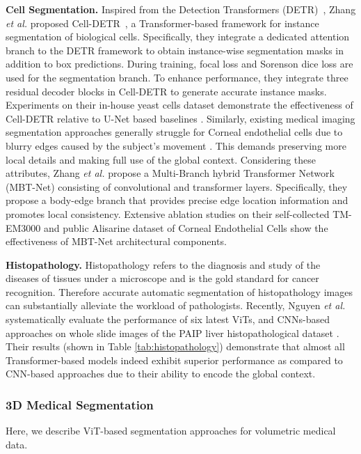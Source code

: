 \documentclass[10pt,journal,compsoc]{IEEEtran}
\begin{document}
 {{\textbf{Cell Segmentation.}}}
Inspired from the Detection Transformers (DETR)~\cite{carion2020end}, Zhang \textit{et al.} proposed Cell-DETR~\cite{prangemeier2020attention}, a Transformer-based framework for instance segmentation of biological cells. Specifically, they integrate a dedicated attention branch to the DETR framework to obtain instance-wise segmentation masks in addition to box predictions. During training, focal loss \cite{lin2017focal} and Sorenson dice loss \cite{carion2020end} are used for the segmentation branch. To enhance performance, they integrate three residual decoder blocks \cite{he2016deep} in Cell-DETR to generate accurate instance masks. Experiments on their in-house yeast cells dataset demonstrate the effectiveness of Cell-DETR relative to U-Net based baselines \cite{ronneberger2015u}. 
Similarly, existing medical imaging segmentation approaches generally struggle for Corneal endothelial cells due to blurry edges caused by the subject's movement \cite{van2019corneal}. This demands preserving more local details and making full use of the global context. Considering these attributes, Zhang \textit{et al.} \cite{zhang2021multi} propose a Multi-Branch hybrid Transformer Network (MBT-Net) consisting of convolutional and transformer layers. Specifically, they propose a body-edge branch that provides precise edge location information and promotes local consistency. Extensive ablation studies  on their self-collected TM-EM3000 and public Alisarine dataset \cite{ruggeri2010system} of Corneal Endothelial Cells show the effectiveness of MBT-Net architectural components.%


 \textbf{Histopathology.}
Histopathology refers to the diagnosis and study of the diseases of tissues under a microscope and is the
gold standard for cancer recognition. Therefore accurate automatic segmentation of histopathology images can substantially alleviate the workload of pathologists. Recently, Nguyen \textit{et al.} \cite{nguyen2021evaluating}
systematically evaluate the performance of six latest ViTs, and CNNs-based approaches on whole slide images of the PAIP liver histopathological dataset \cite{kim2021paip}. Their results (shown in Table \ref{tab:histopathology})  demonstrate that almost all Transformer-based models indeed exhibit superior performance as compared to CNN-based approaches due to their ability to encode the global context. 

\subsubsection{\textbf{3D Medical Segmentation}} Here, we describe ViT-based segmentation approaches for volumetric medical data.
\end{document}

